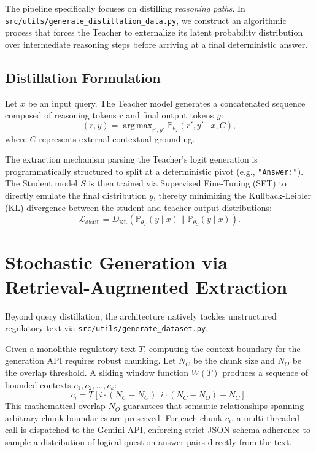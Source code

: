 \documentclass[12pt,a4paper]{report}
\DeclareMathOperator*{\argmax}{arg\,max}
\newcommand{\Loss}{\mathcal{L}}
\newcommand{\Prob}{\mathbb{P}}
\begin{document}
The pipeline specifically focuses on distilling \textit{reasoning paths}. In \texttt{src/utils/generate_distillation_data.py}, we construct an algorithmic process that forces the Teacher to externalize its latent probability distribution over intermediate reasoning steps before arriving at a final deterministic answer.

\subsection{Distillation Formulation}

Let $x$ be an input query. The Teacher model generates a concatenated sequence composed of reasoning tokens $r$ and final output tokens $y$:
\begin{equation}
    (r, y) = \argmax_{r', y'} \Prob_{\theta_T}(r', y' \mid x, C),
\end{equation}
where $C$ represents external contextual grounding.

The extraction mechanism parsing the Teacher's logit generation is programmatically structured to split at a deterministic pivot (e.g., \texttt{"Answer:"}). The Student model $S$ is then trained via Supervised Fine-Tuning (SFT) to directly emulate the final distribution $y$, thereby minimizing the Kullback-Leibler (KL) divergence between the student and teacher output distributions:
\begin{equation}
    \Loss_{\text{distill}} = D_{\text{KL}}(\Prob_{\theta_T}(y \mid x) \parallel \Prob_{\theta_S}(y \mid x)).
\end{equation}

\section{Stochastic Generation via Retrieval-Augmented Extraction}

Beyond query distillation, the architecture natively tackles unstructured regulatory text via \texttt{src/utils/generate_dataset.py}.

Given a monolithic regulatory text $T$, computing the context boundary for the generation API requires robust chunking. Let $N_C$ be the chunk size and $N_O$ be the overlap threshold. A sliding window function $W(T)$ produces a sequence of bounded contexts $c_1, c_2, \dots, c_k$:
\begin{equation}
    c_i = T[i \cdot (N_C - N_O) : i \cdot (N_C - N_O) + N_C].
\end{equation}
This mathematical overlap $N_O$ guarantees that semantic relationships spanning arbitrary chunk boundaries are preserved. For each chunk $c_i$, a multi-threaded call is dispatched to the Gemini API, enforcing strict JSON schema adherence to sample a distribution of logical question-answer pairs directly from the text.
\end{document}
